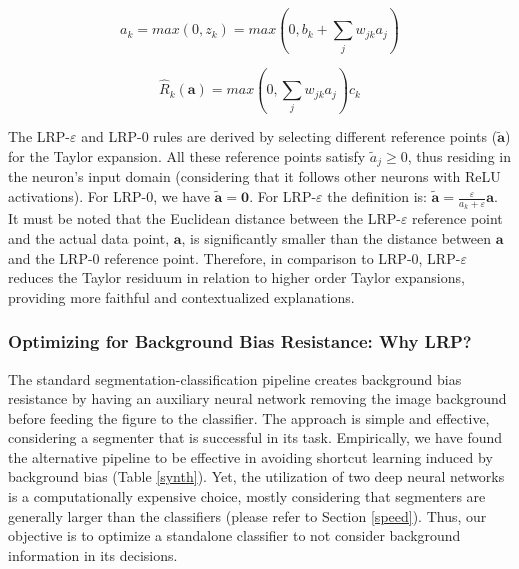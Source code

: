 \documentclass[fleqn,10pt]{wlscirep}
\begin{document}
{\begin{equation}
\label{neuron}
a_{k}=max(0,z_{k})=max(0,b_{k}+\sum_{j} w_{jk}a_{j})
\end{equation}

\begin{equation}
\label{relevanceModel}
\hat{R}_{k}(\bm{a})=max(0,\sum_{j} w_{jk}a_{j})c_{k}
\end{equation}

The LRP-$\varepsilon$ and LRP-0 rules are derived by selecting different reference points ($\bm{\tilde{a}}$) for the Taylor expansion\cite{LRPBook}. All these reference points satisfy $\tilde{a}_{j} \geq 0$, thus residing in the neuron's input domain (considering that it follows other neurons with ReLU activations). For LRP-0, we have $\bm{\tilde{a}}=\bm{0}$. For LRP-$\varepsilon$ the definition is: $\bm{\tilde{a}}=\frac{\varepsilon}{a_{k}+\varepsilon}\bm{a}$. It must be noted that the Euclidean distance between the LRP-$\varepsilon$ reference point and the actual data point, $\bm{a}$, is significantly smaller than the distance between $\bm{a}$ and the LRP-0 reference point\cite{LRPBook}. Therefore, in comparison to LRP-0, LRP-$\varepsilon$ reduces the Taylor residuum in relation to higher order Taylor expansions, providing more faithful and contextualized explanations\cite{LRPBook}.

\subsubsection{Optimizing for Background Bias Resistance: Why LRP?}

The standard segmentation-classification pipeline creates background bias resistance by having an auxiliary neural network removing the image background before feeding the figure to the classifier. The approach is simple and effective, considering a segmenter that is successful in its task. Empirically, we have found the alternative pipeline to be effective in avoiding shortcut learning induced by background bias (Table \ref{synth}). Yet, the utilization of two deep neural networks is a computationally expensive choice, mostly considering that segmenters are generally larger than the classifiers (please refer to Section \ref{speed}). Thus, our objective is to optimize a standalone classifier to not consider background information in its decisions.

}
\end{document}
